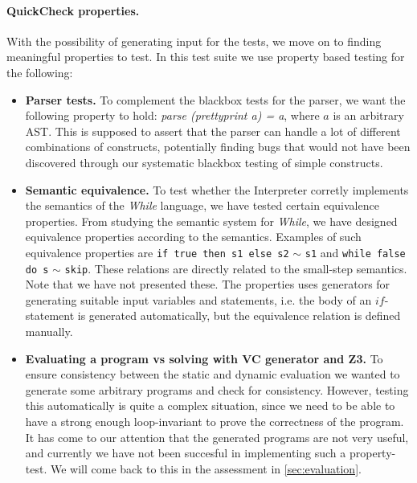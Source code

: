 \paragraph{QuickCheck properties.}
With the possibility of generating input for the tests, we move on to finding meaningful properties to test. In this test suite we use property based testing for the following:
\begin{itemize}
  \item \textbf{Parser tests.}
  To complement the blackbox tests for the parser, we want the following property to hold: \textit{parse (prettyprint a) = a}, where $a$ is an arbitrary AST. This is supposed to assert that the parser can handle a lot of different combinations of constructs, potentially finding bugs that would not have been discovered through our systematic blackbox testing of simple constructs.
	\item \textbf{Semantic equivalence.}
  To test whether the Interpreter corretly implements the semantics of the \textit{While} language, we have tested certain equivalence properties. From studying the semantic system for \textit{While}, we have designed equivalence properties according to the semantics.
	Examples of such equivalence properties are \texttt{if true then s1 else s2} $\sim$ \texttt{s1} and \texttt{while false do s} $\sim$ \texttt{skip}.
  These relations are directly related to the small-step semantics. Note that we have not presented these. The properties uses generators for generating suitable input variables and statements, i.e. the body of an $if$-statement is generated automatically, but the equivalence relation is defined manually.
	\item \textbf{Evaluating a program vs solving with VC generator and Z3.}
    To ensure consistency between the static and dynamic evaluation we wanted to generate some arbitrary programs and check for consistency.
	However, testing this automatically is quite a complex situation, since we need to be able to have a strong enough loop-invariant to prove the correctness of the program.
	It has come to our attention that the generated programs are not very useful, and currently we have not been succesful in implementing such a property-test. We will come back to this in the assessment in \cref{sec:evaluation}.
\end{itemize}

